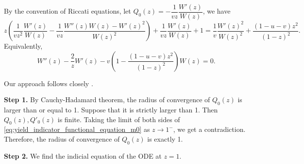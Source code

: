 By the convention of Riccati equations, let $Q_0(z) = -\dfrac{1}{v z}\dfrac{W'(z)}{W(z)}$, we have
$$z\left(\dfrac{1}{vz^2}\dfrac{W'(z)}{W(z)}-\dfrac{1}{vz}\dfrac{W''(z)W(z)-W'(z)^2}{W(z)^2}\right) + \dfrac{1}{v z}\dfrac{W'(z)}{W(z)} + 1 = \dfrac{1}{v}\dfrac{W'(z)^2}{W(z)^2} + \frac{(1-u-v)z^2}{(1-z)^2}.$$
Equivalently,
\begin{equation}
  \label{eq:W_ODE}
  W''(z) - \dfrac{2}{z} W'(z) - v\left(1 - \frac{(1-u-v)z^2}{(1-z)^2}\right) W(z) = 0.
\end{equation}

Our approach follows closely \cite{koechlin2024effects}.

\textbf{Step 1.} By Cauchy-Hadamard theorem, the radius of convergence of $Q_0(z)$ is larger than or equal to 1. Suppose that it is strictly larger than 1. Then $Q_0(z), Q'_0(z)$ is finite. Taking the limit of both sides of \eqref{eq:yield_indicator_functional_equation_m0} as $z\to 1^-$, we get a contradiction. Therefore, the radius of convergence of $Q_0(z)$ is exactly 1.

\textbf{Step 2.} We find the indicial equation of the ODE at $z=1$.